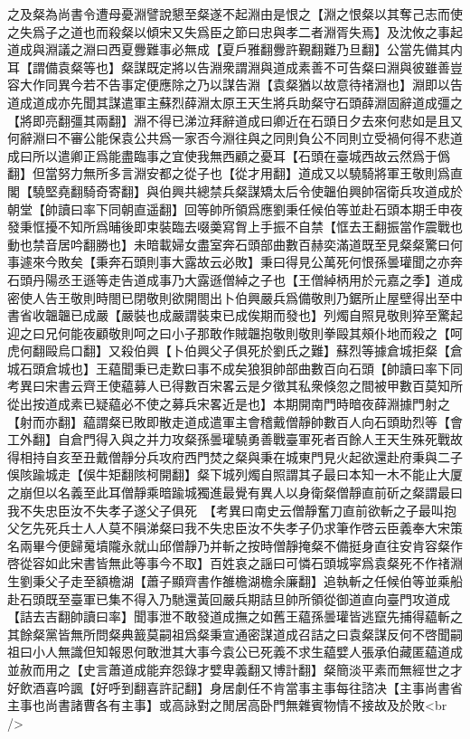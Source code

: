 之及粲為尚書令遭母憂淵譬說懇至粲遂不起淵由是恨之【淵之恨粲以其奪己志而使之失爲子之道也而殺粲以傾宋又失爲臣之節曰忠與孝二者淵胥失焉】及沈攸之事起道成與淵議之淵曰西夏釁難事必無成【夏戶雅翻釁許覲翻難乃旦翻】公當先備其内耳【謂備袁粲等也】粲謀既定將以告淵衆謂淵與道成素善不可告粲曰淵與彼雖善豈容大作同異今若不告事定便應除之乃以謀告淵【袁粲猶以故意待禇淵也】淵即以告道成道成亦先聞其謀遣軍主蘇烈薛淵太原王天生將兵助粲守石頭薛淵固辭道成彊之【將即亮翻彊其兩翻】淵不得已涕泣拜辭道成曰卿近在石頭日夕去來何悲如是且又何辭淵曰不審公能保袁公共爲一家否今淵往與之同則負公不同則立受禍何得不悲道成曰所以遣卿正爲能盡臨事之宜使我無西顧之憂耳【石頭在臺城西故云然爲于僞翻】但當努力無所多言淵安都之從子也【從才用翻】道成又以驍騎將軍王敬則爲直閣【驍堅堯翻騎奇寄翻】與伯興共總禁兵粲謀矯太后令使韞伯興帥宿衛兵攻道成於朝堂【帥讀曰率下同朝直遥翻】回等帥所領爲應劉秉任候伯等並赴石頭本期壬申夜發秉恇擾不知所爲晡後即束裝臨去啜羮寫胷上手振不自禁【恇去王翻振當作震戰也動也禁音居吟翻勝也】未暗載婦女盡室奔石頭部曲數百赫奕滿道既至見粲粲驚曰何事遽來今敗矣【秉奔石頭則事大露故云必敗】秉曰得見公萬死何恨孫曇瓘聞之亦奔石頭丹陽丞王遜等走告道成事乃大露遜僧綽之子也【王僧綽柄用於元嘉之季】道成密使人告王敬則時閤已閉敬則欲開閤出卜伯興嚴兵爲備敬則乃鋸所止屋壁得出至中書省收韞韞已成嚴【嚴裝也成嚴謂裝束已成俟期而發也】列燭自照見敬則猝至驚起迎之曰兄何能夜顧敬則呵之曰小子那敢作賊韞抱敬則敬則拳毆其頰仆地而殺之【呵虎何翻毆烏口翻】又殺伯興【卜伯興父子俱死於劉氏之難】蘇烈等據倉城拒粲【倉城石頭倉城也】王藴聞秉已走歎曰事不成矣狼狽帥部曲數百向石頭【帥讀曰率下同　考異曰宋書云齊王使藴募人已得數百宋畧云是夕徵其私衆倏忽之間被甲數百莫知所從出按道成素已疑藴必不使之募兵宋畧近是也】本期開南門時暗夜薛淵據門射之【射而亦翻】藴謂粲已敗即散走道成遣軍主會稽戴僧靜帥數百人向石頭助烈等【會工外翻】自倉門得入與之并力攻粲孫曇瓘驍勇善戰臺軍死者百餘人王天生殊死戰故得相持自亥至丑戴僧靜分兵攻府西門焚之粲與秉在城東門見火起欲還赴府秉與二子俁陔踰城走【俁牛矩翻陔柯開翻】粲下城列燭自照謂其子最曰本知一木不能止大厦之崩但以名義至此耳僧靜乘暗踰城獨進最覺有異人以身衛粲僧靜直前斫之粲謂最曰我不失忠臣汝不失孝子遂父子俱死　【考異曰南史云僧靜奮刀直前欲斬之子最叫抱父乞先死兵士人人莫不隕涕粲曰我不失忠臣汝不失孝子仍求筆作啓云臣義奉大宋策名兩畢今便歸䰟墳隴永就山邱僧靜乃并斬之按時僧靜掩粲不備挺身直往安肯容粲作啓從容如此宋書皆無此等事今不取】百姓哀之謡曰可憐石頭城寜爲袁粲死不作禇淵生劉秉父子走至額檐湖【蕭子顯齊書作雒檐湖檐余廉翻】追執斬之任候伯等並乘船赴石頭既至臺軍已集不得入乃馳還黃回嚴兵期詰旦帥所領從御道直向臺門攻道成【詰去吉翻帥讀曰率】聞事泄不敢發道成撫之如舊王藴孫曇瓘皆逃竄先捕得藴斬之其餘粲黨皆無所問粲典籖莫嗣祖爲粲秉宣通密謀道成召詰之曰袁粲謀反何不啓聞嗣祖曰小人無識但知報恩何敢泄其大事今袁公已死義不求生藴嬖人張承伯藏匿藴道成並赦而用之【史言蕭道成能弃怨錄才嬖卑義翻又博計翻】粲簡淡平素而無經世之才好飲酒喜吟諷【好呼到翻喜許記翻】身居劇任不肯當事主事每往諮决【主事尚書省主事也尚書諸曹各有主事】或高詠對之閒居高卧門無雜賓物情不接故及於敗<br />
